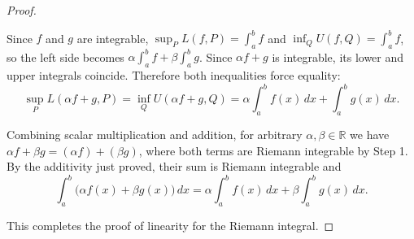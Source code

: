 \begin{proof}
\begin{enumerate}
    Since $f$ and $g$ are integrable, $\sup_P L(f,P) = \int_a^b f$ and $\inf_Q U(f,Q) = \int_a^b f$, so the left side becomes $\alpha \int_a^b f + \beta \int_a^b g$. Since $\alpha f+g$ is integrable, its lower and upper integrals coincide. Therefore both inequalities force equality:
    $$\sup_P L(\alpha f + g,P) = \inf_Q U(\alpha f + g,Q) = \alpha \int_a^b f(x)\,dx + \int_a^b g(x)\,dx.$$

    Combining scalar multiplication and addition, for arbitrary $\alpha,\beta \in \mathbb{R}$ we have $\alpha f + \beta g = (\alpha f) + (\beta g)$, where both terms are Riemann integrable by Step 1. By the additivity just proved, their sum is Riemann integrable and
    $$\int_a^b \bigl(\alpha f(x) + \beta g(x)\bigr)\,dx = \alpha \int_a^b f(x)\,dx + \beta \int_a^b g(x)\,dx.$$
\end{enumerate}
This completes the proof of linearity for the Riemann integral.
\end{proof}
